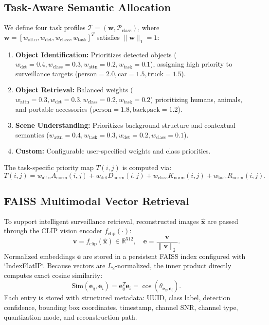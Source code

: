 \documentclass[journal,twocolumn]{IEEEtran}
\begin{document}
\subsection{Task-Aware Semantic Allocation}
We define four task profiles $\mathcal{T} = (\mathbf{w}, \mathcal{P}_{\text{class}})$, where $\mathbf{w} = [w_{\text{attn}}, w_{\text{det}}, w_{\text{class}}, w_{\text{task}}]^T$ satisfies $\|\mathbf{w}\|_1 = 1$:
\begin{enumerate}
    \item \textbf{Object Identification:} Prioritizes detected objects ($w_{\text{det}} = 0.4, w_{\text{class}} = 0.3, w_{\text{attn}} = 0.2, w_{\text{task}} = 0.1$), assigning high priority to surveillance targets ($\text{person}=2.0, \text{car}=1.5, \text{truck}=1.5$).
    \item \textbf{Object Retrieval:} Balanced weights ($w_{\text{attn}} = 0.3, w_{\text{det}} = 0.3, w_{\text{class}} = 0.2, w_{\text{task}} = 0.2$) prioritizing humans, animals, and portable accessories ($\text{person}=1.8, \text{backpack}=1.2$).
    \item \textbf{Scene Understanding:} Prioritizes background structure and contextual semantics ($w_{\text{attn}} = 0.4, w_{\text{task}} = 0.3, w_{\text{det}} = 0.2, w_{\text{class}} = 0.1$).
    \item \textbf{Custom:} Configurable user-specified weights and class priorities.
\end{enumerate}

The task-specific priority map $T(i,j)$ is computed via:
\begin{equation}
T(i,j) = w_{\text{attn}} A_{\text{norm}}(i,j) + w_{\text{det}} D_{\text{norm}}(i,j) + w_{\text{class}} K_{\text{norm}}(i,j) + w_{\text{task}} R_{\text{norm}}(i,j).
\label{eq:task_priority_formula}
\end{equation}

\subsection{FAISS Multimodal Vector Retrieval}
To support intelligent surveillance retrieval, reconstructed images $\hat{\mathbf{x}}$ are passed through the CLIP vision encoder $f_{\text{clip}}(\cdot)$:
\begin{equation}
\mathbf{v} = f_{\text{clip}}(\hat{\mathbf{x}}) \in \mathbb{R}^{512}, \quad \mathbf{e} = \frac{\mathbf{v}}{\|\mathbf{v}\|_2}.
\label{eq:clip_embed}
\end{equation}
Normalized embeddings $\mathbf{e}$ are stored in a persistent FAISS index configured with `IndexFlatIP`. Because vectors are $L_2$-normalized, the inner product directly computes exact cosine similarity:
\begin{equation}
\text{Sim}(\mathbf{e}_q, \mathbf{e}_i) = \mathbf{e}_q^T \mathbf{e}_i = \cos(\theta_{\mathbf{e}_q, \mathbf{e}_i}).
\label{eq:cosine_sim}
\end{equation}
Each entry is stored with structured metadata: UUID, class label, detection confidence, bounding box coordinates, timestamp, channel SNR, channel type, quantization mode, and reconstruction path.
\end{document}
